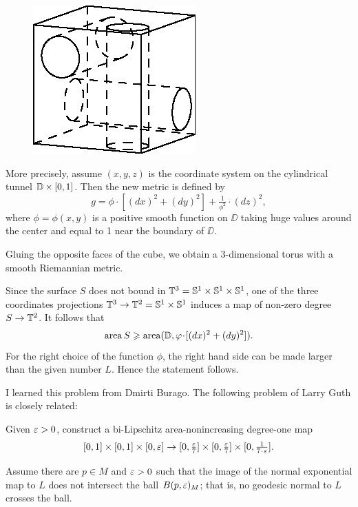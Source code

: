 \medskip

\begin{figure}
\vskip-4mm
\centering
\includegraphics{asy/cube}
\end{figure}

More precisely, assume $(x,y,z)$ is the coordinate system on the cylindrical tunnel $\DD\z\times [0,1]$. 
Then the new metric is defined by
\[g=\phi\cdot [(dx)^2+ (dy)^2]+\tfrac1{\phi^2}\cdot (dz)^2,\]
where $\phi=\phi(x,y)$ is a positive smooth function on $\DD$ taking huge values around the center and equal to 1 near the boundary of $\DD$.


Gluing the opposite faces of the cube, we obtain a 3-dimensional torus with a smooth Riemannian metric.

Since the surface $S$ does not bound in $\mathbb{T}^3=\mathbb{S}^1\times\mathbb{S}^1\times\mathbb{S}^1$,
one of the three coordinates projections $\mathbb{T}^3\to\mathbb{T}^2=\mathbb{S}^1\times\mathbb{S}^1$
induces a map of non-zero degree $S\to\mathbb{T}^2$.
It follows that 
\[\area S\ge  \area(\DD,\phi\cdot [(dx)^2+ (dy)^2]).\]
For the right choice of the function $\phi$, the right hand side can be made larger than the given number $L$.
Hence the statement follows.
\qeds

I learned this problem from Dmirti Burago.
The following problem of Larry Guth \cite{guth} is closely related:

\begin{pr}
Given $\varepsilon>0$, construct a bi-Lipschitz area-nonincreasing degree-one map 
\[[0,1]\times[0,1]\times [0,\eps]\to [0,\tfrac\eps7]\times [0,\tfrac\eps7]\times [0,\tfrac1{7\cdot\eps}].\]

\end{pr}


 
Assume there are $p\in M$ and $\varepsilon>0$ 
such that the image of the normal exponential map to $L$
 does not intersect the ball $B(p,\varepsilon)_M$; that is, no geodesic normal to $L$ crosses the ball.

